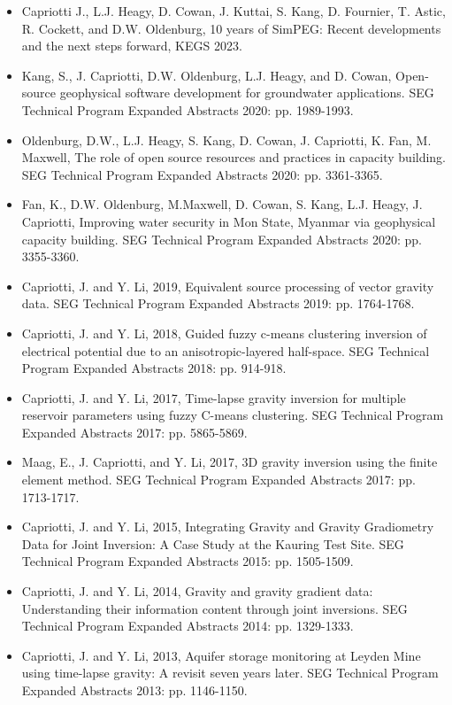 \begin{itemize}
\item Capriotti J., L.J. Heagy, D. Cowan, J. Kuttai, S. Kang, D. Fournier, T. Astic, R. Cockett, and D.W. Oldenburg, 10 years of SimPEG: Recent developments and the next steps forward, KEGS 2023.
\item Kang, S., J. Capriotti, D.W. Oldenburg, L.J. Heagy, and D. Cowan, Open-source geophysical software development for groundwater applications. SEG Technical Program Expanded Abstracts 2020: pp. 1989-1993.
\item Oldenburg, D.W., L.J. Heagy, S. Kang, D. Cowan, J. Capriotti, K. Fan, M. Maxwell, The role of open source resources and practices in capacity building. SEG Technical Program Expanded Abstracts 2020: pp. 3361-3365.
\item Fan, K., D.W. Oldenburg, M.Maxwell, D. Cowan, S. Kang, L.J. Heagy, J. Capriotti, Improving water security in Mon State, Myanmar via geophysical capacity building. SEG Technical Program Expanded Abstracts 2020: pp. 3355-3360.
\item Capriotti, J. and Y. Li, 2019, Equivalent source processing of vector gravity data. SEG Technical Program Expanded Abstracts 2019: pp. 1764-1768.
\item Capriotti, J. and Y. Li, 2018, Guided fuzzy c-means clustering inversion of electrical potential due to an anisotropic-layered half-space. SEG Technical Program Expanded Abstracts 2018: pp. 914-918.
\item Capriotti, J. and Y. Li, 2017, Time-lapse gravity inversion for multiple reservoir parameters using fuzzy C-means clustering. SEG Technical Program Expanded Abstracts 2017: pp. 5865-5869.
\item Maag, E., J. Capriotti, and Y. Li, 2017, 3D gravity inversion using the finite element method. SEG Technical Program Expanded Abstracts 2017: pp. 1713-1717.
\item Capriotti, J. and Y. Li, 2015, Integrating Gravity and Gravity Gradiometry Data for Joint Inversion: A Case Study at the Kauring Test Site. SEG Technical Program Expanded Abstracts 2015: pp. 1505-1509.
\item Capriotti, J. and Y. Li, 2014, Gravity and gravity gradient data: Understanding their information content through joint inversions. SEG Technical Program Expanded Abstracts 2014: pp. 1329-1333.
\item Capriotti, J. and Y. Li, 2013, Aquifer storage monitoring at Leyden Mine using time-lapse gravity: A revisit seven years later. SEG Technical Program Expanded Abstracts 2013: pp. 1146-1150.
\end{itemize}


